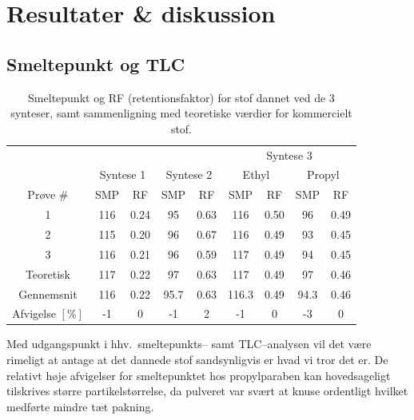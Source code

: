 \section{Resultater \& diskussion}
    \subsection{Smeltepunkt og TLC}
    \begin{table}[H]\centering
        \caption{Smeltepunkt og RF (retentionsfaktor) for stof dannet ved de 3 synteser, samt sammenligning med teoretiske værdier for kommercielt stof.}
        \begin{tabular*}{\linewidth}{c@{\extracolsep{\fill}}cccccccc}
            \toprule
            & & & & & \multicolumn{4}{c}{Syntese 3} \\
            \cmidrule(r){6-9}
            & \multicolumn{2}{c}{Syntese 1} & \multicolumn{2}{c}{Syntese 2} & \multicolumn{2}{c}{Ethyl} & \multicolumn{2}{c}{Propyl} \\
            \cmidrule(r){2-3} \cmidrule(r){4-5} \cmidrule(r){6-7} \cmidrule(r){8-9}
            Prøve \# & SMP & RF & SMP & RF & SMP & RF & SMP & RF \\
            \midrule
            1 & 116 & 0.24 & 95 & 0.63 & 116 & 0.50 & 96 & 0.49 \\
            2 & 115 & 0.20 & 96 & 0.67 & 116 & 0.49 & 93 & 0.45 \\
            3 & 116 & 0.21 & 96 & 0.59 & 117 & 0.49 & 94 & 0.45 \\
            \midrule
            Teoretisk & 117 & 0.22 & 97 & 0.63 & 117 & 0.49 & 97 & 0.46 \\
            Gennemsnit & 116 & 0.22 & 95.7 & 0.63 & 116.3 & 0.49 & 94.3 & 0.46 \\
            \midrule
            Afvigelse $\left[\si{\%}\right]$ & -1 & 0 & -1 & 2 & -1 & 0 & -3 & 0 \\
            \bottomrule
        \end{tabular*}
    \end{table}
    Med udgangspunkt i hhv.\ smeltepunkts-- samt TLC--analysen vil det være rimeligt at antage at det dannede stof sandsynligvis er hvad vi tror det er. De relativt høje afvigelser for smeltepunktet hos propylparaben kan hovedsageligt tilskrives større partikelstørrelse, da pulveret var svært at knuse ordentligt hvilket medførte mindre tæt pakning.

